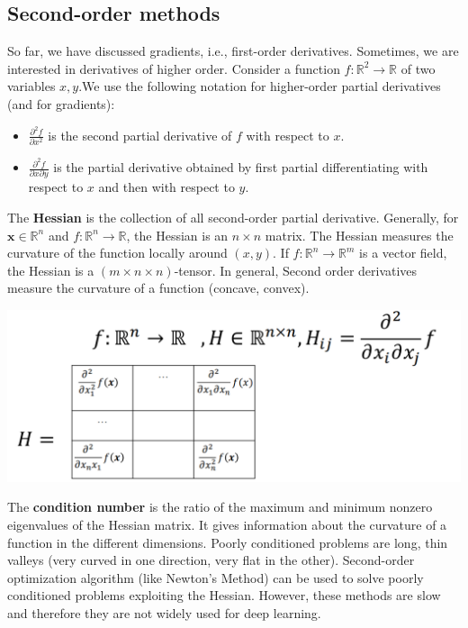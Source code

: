 \subsection{Second-order methods}
So far, we have discussed gradients, i.e., first-order derivatives. Sometimes, we are interested in derivatives of higher order. Consider a function $f: \mathbb{R}^2 \rightarrow \mathbb{R}$ of two variables $x, y$.We use the following notation for higher-order partial derivatives (and for gradients):
\begin{itemize}
    \item $\frac{\partial^2 f}{\partial x^2}$ is the second partial derivative of $f$ with respect to $x$.

    \item $\frac{\partial^2 f}{\partial x \partial y}$ is the partial derivative obtained by first partial differentiating with respect to $x$ and then with respect to $y$.
\end{itemize}
The \textbf{Hessian} is the collection of all second-order partial derivative. Generally, for $\textbf{x} \in \mathbb{R}^n$ and $f: \mathbb{R}^n \rightarrow \mathbb{R}$, the Hessian is an $n \times n$ matrix. The Hessian measures the curvature of the function locally around $(x, y)$. If $f: \mathbb{R}^n \rightarrow \mathbb{R}^m$ is a vector field, the Hessian is a $(m \times n \times n)$-tensor. In general, Second order derivatives measure the curvature of a function (concave, convex).
\begin{center}
    \includegraphics[scale=0.6]{images/hessian.png}
\end{center}
The \textbf{condition number} is the ratio of the maximum and minimum nonzero
eigenvalues of the Hessian matrix. It gives information about the
curvature of a function in the different dimensions. Poorly conditioned problems are long, thin valleys (very curved in one direction, very flat in the other). 
\newline\newline
Second-order optimization algorithm (like Newton’s Method) can be used to solve poorly conditioned problems exploiting the Hessian. However, these methods are slow and therefore they are not widely used for deep learning.

